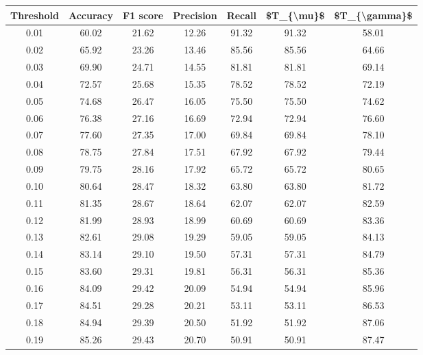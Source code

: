 \begin{tabular}{|c|c|c|c|c|c|c|}
\hline
 Threshold &  Accuracy &  F1 score &  Precision &  Recall &  \$T\_\{\textbackslash mu\}\$ &  \$T\_\{\textbackslash gamma\}\$ \\
\hline
      0.01 &     60.02 &     21.62 &      12.26 &   91.32 &      91.32 &         58.01 \\
      0.02 &     65.92 &     23.26 &      13.46 &   85.56 &      85.56 &         64.66 \\
      0.03 &     69.90 &     24.71 &      14.55 &   81.81 &      81.81 &         69.14 \\
      0.04 &     72.57 &     25.68 &      15.35 &   78.52 &      78.52 &         72.19 \\
      0.05 &     74.68 &     26.47 &      16.05 &   75.50 &      75.50 &         74.62 \\
      0.06 &     76.38 &     27.16 &      16.69 &   72.94 &      72.94 &         76.60 \\
      0.07 &     77.60 &     27.35 &      17.00 &   69.84 &      69.84 &         78.10 \\
      0.08 &     78.75 &     27.84 &      17.51 &   67.92 &      67.92 &         79.44 \\
      0.09 &     79.75 &     28.16 &      17.92 &   65.72 &      65.72 &         80.65 \\
      0.10 &     80.64 &     28.47 &      18.32 &   63.80 &      63.80 &         81.72 \\
      0.11 &     81.35 &     28.67 &      18.64 &   62.07 &      62.07 &         82.59 \\
      0.12 &     81.99 &     28.93 &      18.99 &   60.69 &      60.69 &         83.36 \\
      0.13 &     82.61 &     29.08 &      19.29 &   59.05 &      59.05 &         84.13 \\
      0.14 &     83.14 &     29.10 &      19.50 &   57.31 &      57.31 &         84.79 \\
      0.15 &     83.60 &     29.31 &      19.81 &   56.31 &      56.31 &         85.36 \\
      0.16 &     84.09 &     29.42 &      20.09 &   54.94 &      54.94 &         85.96 \\
      0.17 &     84.51 &     29.28 &      20.21 &   53.11 &      53.11 &         86.53 \\
      0.18 &     84.94 &     29.39 &      20.50 &   51.92 &      51.92 &         87.06 \\
      0.19 &     85.26 &     29.43 &      20.70 &   50.91 &      50.91 &         87.47 \\

\end{tabular}
